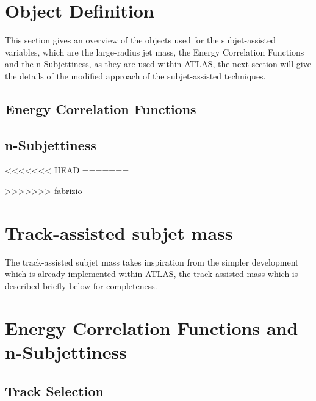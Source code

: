 \documentclass[UKenglish,texlive=2013]{\ATLASLATEXPATH atlasdoc}
\begin{document}
\section{Object Definition}
\label{sec:objdef}

This section gives an overview of the objects used for the subjet-assisted variables, which are the large-radius jet mass, the Energy Correlation Functions and the n-Subjettiness, as they are used within ATLAS, the next section will give the details of the modified approach of the subjet-assisted techniques.





\subsection{Energy Correlation Functions}


\subsection{n-Subjettiness}

<<<<<<< HEAD
=======

>>>>>>> fabrizio

\section{Track-assisted subjet mass}
\label{sec:mtas}
The track-assisted subjet mass takes inspiration from the simpler development which is already implemented within ATLAS, the track-assisted mass which is described briefly below for completeness.



\section{Energy Correlation Functions and n-Subjettiness}
\subsection{Track Selection}

\label{sec:ECFnS}
\end{document}

